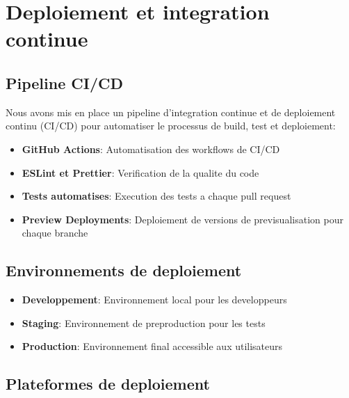 \section{Deploiement et integration continue}
\subsection{Pipeline CI/CD}
Nous avons mis en place un pipeline d'integration continue et de deploiement continu (CI/CD) pour automatiser le processus de build, test et deploiement:

\begin{itemize}
    \item \textbf{GitHub Actions}: Automatisation des workflows de CI/CD
    \item \textbf{ESLint et Prettier}: Verification de la qualite du code
    \item \textbf{Tests automatises}: Execution des tests a chaque pull request
    \item \textbf{Preview Deployments}: Deploiement de versions de previsualisation pour chaque branche
\end{itemize}

\subsection{Environnements de deploiement}
\begin{itemize}
    \item \textbf{Developpement}: Environnement local pour les developpeurs
    \item \textbf{Staging}: Environnement de preproduction pour les tests
    \item \textbf{Production}: Environnement final accessible aux utilisateurs
\end{itemize}

\subsection{Plateformes de deploiement}
